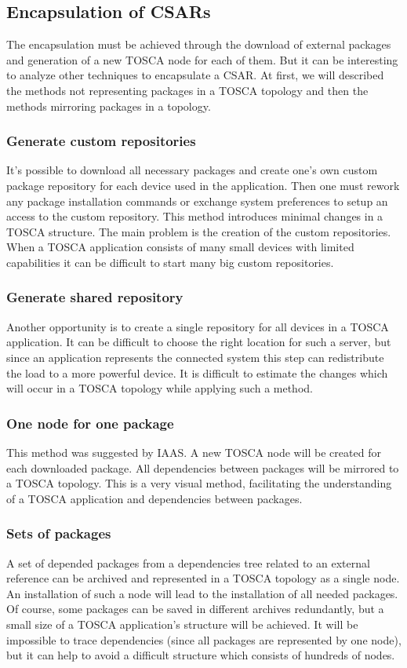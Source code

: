\subsection{Encapsulation of CSARs}
The encapsulation must be achieved through the download of external packages and generation of a new TOSCA node for each of them. 
But it can be interesting to analyze other techniques to encapsulate a CSAR. 
At first, we will described the methods not representing packages in a TOSCA topology and then the methods mirroring packages in a topology.\\

\subsubsection*{Generate custom repositories}
It's possible to download all necessary packages and create one's own custom package repository for each device used in the application. 
Then one must rework any package installation commands or exchange system preferences to setup an access to the custom repository.
This method introduces minimal changes in a TOSCA structure.
The main problem is the creation of the custom repositories. 
When a TOSCA application consists of many small devices with limited capabilities it can be difficult to start many big custom repositories.

\subsubsection*{Generate shared repository}
Another opportunity is to create a single repository for all devices in a TOSCA application.
It can be difficult to choose the right location for such a server, but since an application represents the connected system this step can redistribute the load to a more powerful device.
It is difficult to estimate the changes which will occur in a TOSCA topology while applying such a method.

\subsubsection*{One node for one package}
This method was suggested by IAAS. 
A new TOSCA node will be created for each downloaded package. 
All dependencies between packages will be mirrored to a TOSCA topology.
This is a very visual method, facilitating the understanding of a TOSCA application and dependencies between packages.

\subsubsection*{Sets of packages}
A set of depended packages from a dependencies tree related to an external reference can be archived and represented in a TOSCA topology as a single node.
An installation of such a node will lead to the installation of all needed packages.
Of course, some packages can be saved in different archives redundantly, but a small size of a TOSCA application's structure will be achieved.
It will be impossible to trace dependencies (since all packages are represented by one node), but it can help to avoid a difficult structure which consists of hundreds of nodes. 



